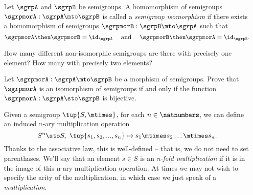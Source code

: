 \begin{definition}
\label{def:semigroup-iso}
Let $\sgrpA$ and $\sgrpB$ be semigroups. A homomorphism of semigroups $\sgrpmorA: \sgrpA \mto \sgrpB$ is called a \emph{semigroup isomorphism} if there exists a homomorphism of semigroups $\sgrpmorB: \sgrpB \mto \sgrpA$ such that
\begin{equation}
\label{sgrp-iso-cond}
\sgrpmorA \then \sgrpmorB = \id_\sgrpA \quad \text{ and } \quad  \sgrpmorB \then \sgrpmorA = \id_\sgrpB.
\end{equation}
\end{definition}

\begin{exercise}
\label{ex:non-isomorphic}
How many different non-isomorphic semigroups are there with precisely one element? How many with precisely two elements?
\end{exercise}
\begin{solution}
\end{solution}

\begin{exercise}
\label{ex:semi-morph}
Let $\sgrpmorA: \sgrpA \mto \sgrpB$ be a morphism of semigroups. Prove that $\sgrpmorA$ is an isomorphism of semigroups if and only if the function $\sgrpmorA: \sgrpA \sto \sgrpB$ is bijective.
\end{exercise}
\begin{solution}
\end{solution}






Given a semigroup $\tup{S, \mtimes}$, for each $n \in \natnumbers$, we can define an induced n-ary multiplication operation
$$
S^n \sto S, \ \tup{s_1, s_2, ..., s_n} \mapsto s_1 \mtimes s_2 \dots \mtimes s_n.
$$
Thanks to the associative law, this is well-defined -- that is, we do not need to set parenthases. We'll say that an element $s \in S$ is an \emph{n-fold multiplication} if it is in the image of this n-ary multiplication operation. At times we may not wish to specify the arity of the multiplication, in which case we just speak of a \emph{multiplication}.


